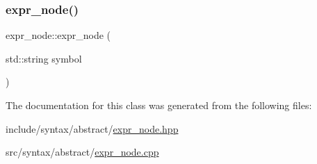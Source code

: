 \subsubsection{\texorpdfstring{expr\+\_\+node()}{expr\_node()}}
{\footnotesize\ttfamily expr\+\_\+node\+::expr\+\_\+node (\begin{DoxyParamCaption}\item[{std\+::string}]{symbol }\end{DoxyParamCaption})}



The documentation for this class was generated from the following files\+:\begin{DoxyCompactItemize}
\item 
include/syntax/abstract/\hyperlink{expr__node_8hpp}{expr\+\_\+node.\+hpp}\item 
src/syntax/abstract/\hyperlink{expr__node_8cpp}{expr\+\_\+node.\+cpp}\end{DoxyCompactItemize}
